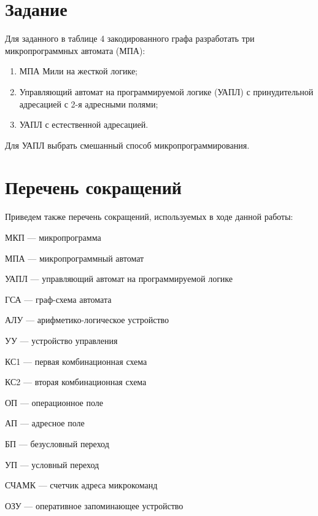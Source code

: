 \documentclass[a4paper,14pt]{extarticle}
\author{Кирилл Денисов}
\date{\today}
\newcommand{\pathToCommonFolder}{/home/denilai/Documents/repos/latex/Common}
\begin{document}
	\thispagestyle{empty}
	
	\newpage
	\newpage
	
	
	\section*{Задание}
	Для заданного в таблице 4 закодированного графа разработать три микропрограммных автомата (МПА):
	\begin{enumerate}
		\item МПА Мили на жесткой логике;
		\item Управляющий автомат на программируемой
		логике (УАПЛ) с принудительной адресацией с 2-я адресными полями;
		\item УАПЛ с естественной адресацией. 
	\end{enumerate}
	Для УАПЛ выбрать смешанный способ микропрограммирования.
	
	
	
	
	\section*{Перечень сокращений}
	Приведем также перечень сокращений, используемых в ходе данной работы:
	
	МКП --- микропрограмма
	
	МПА --- микропрограммный автомат
	
	УАПЛ --- управляющий автомат на программируемой логике
	
	ГСА --- граф-схема автомата
	
	АЛУ --- арифметико-логическое устройство
	
	УУ --- устройство управления
	
	КС1 --- первая комбинационная схема 
	
	КС2 --- вторая комбинационная схема 
	
	ОП --- операционное поле
	
	АП --- адресное поле 
	
	БП --- безусловный переход
	
	УП --- условный переход
	
	
	
	
	
	СЧАМК --- счетчик адреса микрокоманд
	
	ОЗУ  --- оперативное запоминающее устройство
	
\end{document}
